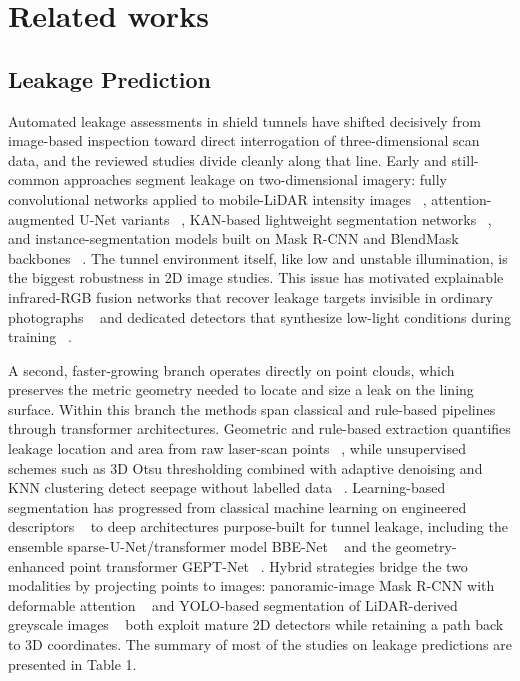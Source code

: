 \documentclass[preprint,12pt,authoryear]{elsarticle}
\begin{document}
\section{Related works}
\label{related-works}

\subsection{\textbf{Leakage Prediction}}%

Automated leakage assessments in shield tunnels have shifted decisively
from image-based inspection toward direct interrogation of
three-dimensional scan data, and the reviewed studies divide cleanly
along that line. Early and still-common approaches segment leakage on
two-dimensional imagery: fully convolutional networks applied to
mobile-LiDAR intensity images ~\citep{Cheng2021}, attention-augmented
U-Net variants ~\citep{Wang2024_2}, KAN-based lightweight segmentation
networks ~\citep{He2025}, and instance-segmentation models built on
Mask R-CNN and BlendMask backbones ~\citep{Geng2023, Wang2024}. The tunnel environment itself, like low and unstable
illumination, is the biggest robustness in 2D image studies. This issue
has motivated explainable infrared-RGB fusion networks that recover
leakage targets invisible in ordinary photographs ~\citep{Yao2025} and
dedicated detectors that synthesize low-light conditions during training
~\citep{Liu2024}.

A second, faster-growing branch operates directly on point clouds, which
preserves the metric geometry needed to locate and size a leak on the
lining surface. Within this branch the methods span classical and
rule-based pipelines through transformer architectures. Geometric and
rule-based extraction quantifies leakage location and area from raw
laser-scan points ~\citep{Li2024}, while unsupervised schemes such
as 3D Otsu thresholding combined with adaptive denoising and KNN
clustering detect seepage without labelled data ~\citep{Wang2024}.
Learning-based segmentation has progressed from classical machine
learning on engineered descriptors ~\citep{Huang2026a} to deep
architectures purpose-built for tunnel leakage, including the ensemble
sparse-U-Net/transformer model BBE-Net ~\citep{Jiang2025b} and the
geometry-enhanced point transformer GEPT-Net ~\citep{Jiang2025a}.
Hybrid strategies bridge the two modalities by projecting points to
images: panoramic-image Mask R-CNN with deformable attention ~\citep{Li2026} and YOLO-based segmentation of LiDAR-derived greyscale images
~\citep{Liang2025} both exploit mature 2D detectors while retaining a
path back to 3D coordinates. The summary of most of the studies on
leakage predictions are presented in Table 1.
\end{document}
